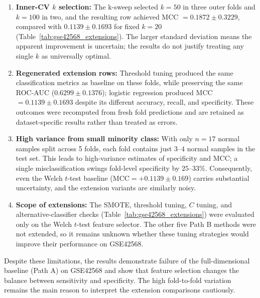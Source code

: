 \begin{enumerate}
    \item \textbf{Inner-CV $k$ selection:} The k-sweep selected $k=50$ in three outer folds and $k=100$ in two, and the resulting row achieved MCC $=0.1872 \pm 0.3229$, compared with $0.1139 \pm 0.1693$ for fixed $k=20$ (Table~\ref{tab:gse42568_extensions}). The larger standard deviation means the apparent improvement is uncertain; the results do not justify treating any single $k$ as universally optimal.
    
    \item \textbf{Regenerated extension rows:} Threshold tuning produced the same classification metrics as baseline on these folds, while preserving the same ROC-AUC ($0.6299 \pm 0.1376$); logistic regression produced MCC $=0.1139 \pm 0.1693$ despite its different accuracy, recall, and specificity. These outcomes were recomputed from fresh fold predictions and are retained as dataset-specific results rather than treated as errors.
    
    \item \textbf{High variance from small minority class:} With only $n=17$ normal samples split across 5 folds, each fold contains just $3$--$4$ normal samples in the test set. This leads to high-variance estimates of specificity and MCC; a single misclassification swings fold-level specificity by $25$--$33\%$. Consequently, even the Welch $t$-test baseline ($\text{MCC} = +0.1139 \pm 0.169$) carries substantial uncertainty, and the extension variants are similarly noisy.
    
    \item \textbf{Scope of extensions:} The SMOTE, threshold tuning, $C$ tuning, and alternative-classifier checks (Table~\ref{tab:gse42568_extensions}) were evaluated only on the Welch $t$-test feature selector. The other five Path B methods were not extended, so it remains unknown whether these tuning strategies would improve their performance on GSE42568.
\end{enumerate}

Despite these limitations, the results demonstrate failure of the full-dimensional baseline (Path A) on GSE42568 and show that feature selection changes the balance between sensitivity and specificity. The high fold-to-fold variation remains the main reason to interpret the extension comparisons cautiously.